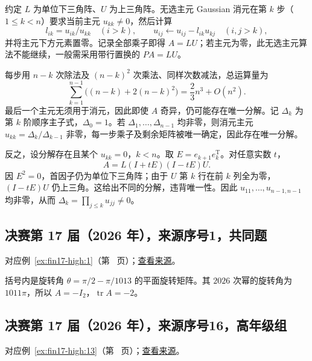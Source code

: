 \documentclass[UTF8,12pt,a4paper,fontset=fandol]{ctexart}
\begin{document}
\begin{solve}

约定 $L$ 为单位下三角阵、$U$ 为上三角阵。无选主元 Gaussian 消元在第 $k$ 步（$1\le k<n$）要求当前主元 $u_{kk}\ne0$，然后计算
\[
l_{ik}=u_{ik}/u_{kk}\quad(i>k),\qquad
u_{ij}\leftarrow u_{ij}-l_{ik}u_{kj}\quad(i,j>k),
\]
并将主元下方元素置零。记录全部乘子即得 $A=LU$；若主元为零，此无选主元算法不能继续，一般需采用带行置换的 $PA=LU$。

每步用 $n-k$ 次除法及 $(n-k)^2$ 次乘法、同样次数减法，总运算量为
\[
\sum_{k=1}^{n-1}\bigl((n-k)+2(n-k)^2\bigr)
=\frac23n^3+O(n^2).
\]
最后一个主元无须用于消元，因此即使 $A$ 奇异，仍可能存在唯一分解。记 $\Delta_k$ 为第 $k$ 阶顺序主子式，$\Delta_0=1$。若 $\Delta_1,\dots,\Delta_{n-1}$ 均非零，则消元主元 $u_{kk}=\Delta_k/\Delta_{k-1}$ 非零，每一步乘子及剩余矩阵被唯一确定，因此存在唯一分解。

反之，设分解存在且某个 $u_{kk}=0$，$k<n$。取 $E=e_{k+1}e_k^{\mathrm T}$。对任意实数 $t$，
\[
A=L(I+tE)(I-tE)U.
\]
因 $E^2=0$，首因子仍为单位下三角阵；由于 $U$ 第 $k$ 行在前 $k$ 列全为零，$(I-tE)U$ 仍上三角。这给出不同的分解，违背唯一性。因此 $u_{11},\dots,u_{n-1,n-1}$ 均非零，从而 $\Delta_k=\prod_{j\le k}u_{jj}\ne0$。

\end{solve}

\subsection{决赛第 17 届（2026 年），来源序号1，共同题}\label{ans:fin17-high:1}\label{pr:fin17-high:1}

对应例~\ref{ex:fin17-high:1}（第~\pageref{ex:fin17-high:1} 页）；\href{https://github.com/lzxcr/cmc-mathematics/blob/64916fa1fdbc3e444a652eca204d5669058ee321/src/problems/finals/17/01.md}{查看来源}。

\begin{solve}

括号内是旋转角 $\theta=\pi/2-\pi/1013$ 的平面旋转矩阵。其 $2026$ 次幂的旋转角为 $1011\pi$，所以 $A=-I_2$，$\boxed{\operatorname{tr}A=-2}$。

\end{solve}

\subsection{决赛第 17 届（2026 年），来源序号16，高年级组}\label{ans:fin17-high:13}\label{pr:fin17-high:13}

对应例~\ref{ex:fin17-high:13}（第~\pageref{ex:fin17-high:13} 页）；\href{https://github.com/lzxcr/cmc-mathematics/blob/64916fa1fdbc3e444a652eca204d5669058ee321/src/problems/finals/17/16.md}{查看来源}。
\end{document}
